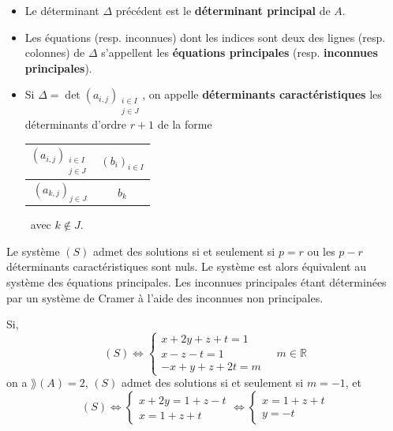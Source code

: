   \begin{definition}
    \begin{itemize}
      \item Le déterminant $\Delta$ précédent est le \textbf{déterminant principal} de $A$.
      \item Les équations (resp. inconnues) dont les indices sont deux des lignes (resp. colonnes) de $\Delta$ s'appellent les \textbf{équations principales} (resp. \textbf{inconnues principales}).
      \item Si $\Delta = \det(a_{i,j})_{\substack{i \in I \\ j \in J}}$, on appelle \textbf{déterminants caractéristiques} les déterminants d'ordre $r+1$ de la forme
      \begin{center}
        \begin{tabular}{|c|c|}
          $(a_{i,j})_{\substack{i \in I \\ j \in J}}$ & $(b_i)_{i \in I}$ \\
          \hline
          $(a_{k,j})_{j \in J}$ & $b_k$
        \end{tabular}
        \, avec $k \notin J$.
      \end{center}
    \end{itemize}
  \end{definition}

  \begin{theorem}
    Le système $(S)$ admet des solutions si et seulement si $p = r$ ou les $p-r$ déterminants caractéristiques sont nuls. Le système est alors équivalent au système des équations principales. Les inconnues principales étant déterminées par un système de Cramer à l'aide des inconnues non principales.
  \end{theorem}

  \begin{example}
    Si,
    \[
    (S) \iff
    \begin{cases}
      x + 2y + z + t = 1 \\
      x - z - t = 1 \\
      -x + y + z + 2t = m
    \end{cases}
    \quad
    m \in \mathbb{R}
    \]
    on a $\rang(A) = 2$, $(S)$ admet des solutions si et seulement si $m=-1$, et
    \[
    (S)
    \iff \begin{cases}
      x + 2y = 1 + z - t \\
      x = 1 + z + t
    \end{cases}
    \iff \begin{cases}
      x = 1 + z + t \\
      y = -t
    \end{cases}
    \]
  \end{example}

